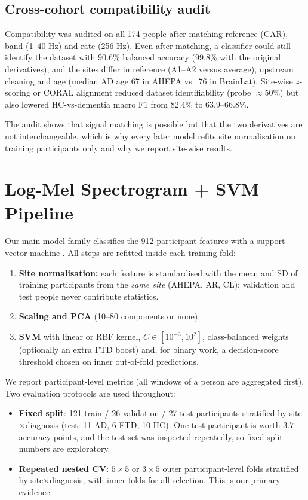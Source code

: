 \documentclass[10pt,twocolumn,a4paper]{article}
\begin{document}
\subsection{Cross-cohort compatibility audit}
\label{sec:compat}
Compatibility was audited on all 174 people after matching reference (CAR), band (1--40 Hz) and rate (256 Hz). Even after matching, a classifier could still identify the dataset with $90.6\%$ balanced accuracy (99.8\% with the original derivatives), and the sites differ in reference (A1--A2 versus average), upstream cleaning and age (median AD age 67 in AHEPA vs.\ 76 in BrainLat). Site-wise $z$-scoring or CORAL alignment reduced dataset identifiability (probe $\approx$50\%) but also lowered HC-vs-dementia macro F1 from $82.4\%$ to $63.9$--$66.8\%$.

The audit shows that signal matching is possible but that the two derivatives are not interchangeable, which is why every later model refits site normalisation on training participants only and why we report site-wise results.

\section{Log-Mel Spectrogram + SVM Pipeline}
\label{sec:logmel}
Our main model family classifies the 912 participant features with a support-vector machine \cite{cortes1995}. All steps are refitted inside each training fold:
\begin{enumerate}[label=(\arabic*)]
\item \textbf{Site normalisation:} each feature is standardised with the mean and SD of training participants from the \emph{same site} (AHEPA, AR, CL); validation and test people never contribute statistics.
\item \textbf{Scaling and PCA} (10--80 components or none).
\item \textbf{SVM} with linear or RBF kernel, $C\in[10^{-3},10^{2}]$, class-balanced weights (optionally an extra FTD boost) and, for binary work, a decision-score threshold chosen on inner out-of-fold predictions.
\end{enumerate}
We report participant-level metrics (all windows of a person are aggregated first). Two evaluation protocols are used throughout:
\begin{itemize}
\item \textbf{Fixed split}: 121 train / 26 validation / 27 test participants stratified by site$\times$diagnosis (test: 11 AD, 6 FTD, 10 HC). One test participant is worth $3.7$ accuracy points, and the test set was inspected repeatedly, so fixed-split numbers are exploratory.
\item \textbf{Repeated nested CV}: $5{\times}5$ or $3{\times}5$ outer participant-level folds stratified by site$\times$diagnosis, with inner folds for all selection. This is our primary evidence.
\end{itemize}
\end{document}
